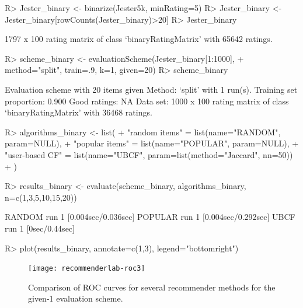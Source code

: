 \documentclass[nojss]{jss}
\begin{document}
\begin{Schunk}
\begin{Sinput}
R> Jester_binary <- binarize(Jester5k, minRating=5)
R> Jester_binary <- Jester_binary[rowCounts(Jester_binary)>20]
R> Jester_binary
\end{Sinput}
\begin{Soutput}
1797 x 100 rating matrix of class ‘binaryRatingMatrix’ with 65642 ratings.
\end{Soutput}
\begin{Sinput}
R> scheme_binary <- evaluationScheme(Jester_binary[1:1000],
+ 	method="split", train=.9, k=1, given=20)
R> scheme_binary
\end{Sinput}
\begin{Soutput}
Evaluation scheme with 20 items given
Method: ‘split’ with 1 run(s).
Training set proportion: 0.900
Good ratings: NA
Data set: 1000 x 100 rating matrix of class ‘binaryRatingMatrix’ with 36468 ratings.
\end{Soutput}
\begin{Sinput}
R> algorithms_binary <- list(
+         "random items" = list(name="RANDOM", param=NULL),
+         "popular items" = list(name="POPULAR", param=NULL),
+         "user-based CF" = list(name="UBCF", param=list(method="Jaccard", nn=50))
+         )
\end{Sinput}
\end{Schunk}

\begin{Schunk}
\begin{Sinput}
R> results_binary <- evaluate(scheme_binary, algorithms_binary, n=c(1,3,5,10,15,20))
\end{Sinput}
\begin{Soutput}
RANDOM run
	 1  [0.004sec/0.036sec]
POPULAR run
	 1  [0.004sec/0.292sec]
UBCF run
	 1  [0sec/0.44sec]
\end{Soutput}
\end{Schunk}

\begin{Schunk}
\begin{Sinput}
R> plot(results_binary, annotate=c(1,3), legend="bottomright")
\end{Sinput}
\end{Schunk}
\begin{figure}
\centerline{\texttt{[image: recommenderlab-roc3]}}
\caption{Comparison of ROC curves for several recommender methods for the given-1 evaluation scheme.}
\label{fig:roc3}
\end{figure}
\end{document}
